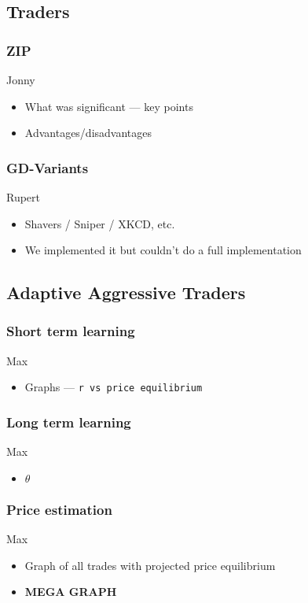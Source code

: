 \documentclass{acm_proc_article-sp}
\begin{document}
\subsection{Traders}
\subsubsection{ZIP}
Jonny
\begin{itemize} \itemsep0pt
	\item What was significant --- key points
	\item Advantages/disadvantages
\end{itemize}

\subsubsection{GD-Variants}
Rupert
\begin{itemize} \itemsep0pt
	\item Shavers / Sniper / XKCD, etc.
	\item We implemented it but couldn't do a full implementation
\end{itemize}

\subsection{Adaptive Aggressive Traders}
\subsubsection{Short term learning}
Max
\begin{itemize} \itemsep0pt
	\item Graphs --- \tt r \rm vs price equilibrium
\end{itemize}

\subsubsection{Long term learning}
Max
\begin{itemize} \itemsep0pt
	\item $\theta$
\end{itemize}

\subsubsection{Price estimation}
Max
\begin{itemize} \itemsep0pt
	\item Graph of all trades with projected price equilibrium
	\item \textbf{MEGA GRAPH}
\end{itemize}
\end{document}
